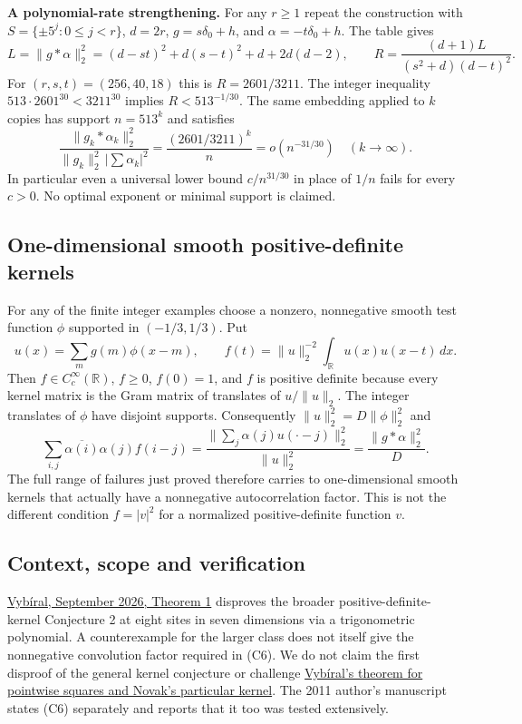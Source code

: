 \documentclass[11pt]{article}
\begin{document}
\textbf{A polynomial-rate strengthening.} For any \(r\ge1\) repeat the construction with \(S=\{\pm5^j:0\le j<r\}\), \(d=2r\), \(g=s\delta_0+h\), and \(\alpha=-t\delta_0+h\). The table gives \[
 L=\|g*\alpha\|_2^2=(d-st)^2+d(s-t)^2+d+2d(d-2),\qquad
 R=\frac{(d+1)L}{(s^2+d)(d-t)^2}.
\] For \((r,s,t)=(256,40,18)\) this is \(R=2601/3211\). The integer inequality \(513\cdot2601^{30}<3211^{30}\) implies \(R<513^{-1/30}\). The same embedding applied to \(k\) copies has support \(n=513^k\) and satisfies \[
 \frac{\|g_k*\alpha_k\|_2^2}{\|g_k\|_2^2\, |\sum\alpha_k|^2}
 =\frac{(2601/3211)^k}{n}=o(n^{-31/30})
 \quad(k\to\infty).
\] In particular even a universal lower bound \(c/n^{31/30}\) in place of \(1/n\) fails for every \(c>0\). No optimal exponent or minimal support is claimed.

\subsection{One-dimensional smooth positive-definite kernels}\label{one-dimensional-smooth-positive-definite-kernels}

For any of the finite integer examples choose a nonzero, nonnegative smooth test function \(\phi\) supported in \((-1/3,1/3)\). Put \[
 u(x)=\sum_m g(m)\phi(x-m),\qquad
 f(t)=\|u\|_2^{-2}\int_{\mathbb R}u(x)u(x-t)\,dx.
\] Then \(f\in C_c^\infty(\mathbb R)\), \(f\ge0\), \(f(0)=1\), and \(f\) is positive definite because every kernel matrix is the Gram matrix of translates of \(u/\|u\|_2\). The integer translates of \(\phi\) have disjoint supports. Consequently \(\|u\|_2^2=D\|\phi\|_2^2\) and \[
 \sum_{i,j}\overline{\alpha(i)}\alpha(j) f(i-j)
 =\frac{\|\sum_j\alpha(j)u(\cdot-j)\|_2^2}{\|u\|_2^2}
 =\frac{\|g*\alpha\|_2^2}{D}.
\] The full range of failures just proved therefore carries to one-dimensional smooth kernels that actually have a nonnegative autocorrelation factor. This is not the different condition \(f=|v|^2\) for a normalized positive-definite function \(v\).

\subsection{Context, scope and verification}\label{context-scope-and-verification}

\href{https://arxiv.org/html/2609.21733v1}{Vybíral, September 2026, Theorem 1} disproves the broader positive-definite-kernel Conjecture 2 at eight sites in seven dimensions via a trigonometric polynomial. A counterexample for the larger class does not itself give the nonnegative convolution factor required in (C6). We do not claim the first disproof of the general kernel conjecture or challenge \href{https://people.fjfi.cvut.cz/vybirja2/TUM-IBC/Vybiral_Advances.pdf}{Vybíral's theorem for pointwise squares and Novak's particular kernel}. The 2011 author's manuscript states (C6) separately and reports that it too was tested extensively.
\end{document}

